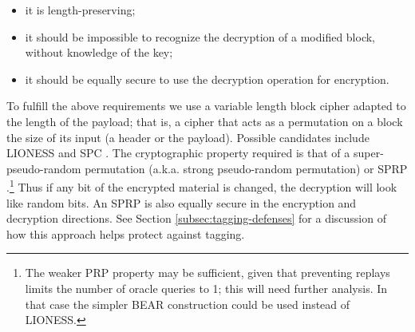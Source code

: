 \documentclass[11pt]{IEEEtran}
\begin{document}
\begin{itemize}
\item it is length-preserving;

\item it should be impossible to recognize the decryption of a modified
      block, without knowledge of the key;
\item it should be equally secure to use the decryption operation
      for encryption.
\end{itemize}

To fulfill the above requirements we use a variable length block
cipher adapted to the length of the payload; that
is, a cipher that acts as a permutation on a block the size of its
input (a header or the payload).  Possible candidates
include LIONESS \cite{BEAR-LIONESS} and SPC \cite{SPC}.
The cryptographic property required is that of a super-pseudo-random
permutation (a.k.a. strong pseudo-random permutation) or SPRP \cite{sprp}.\footnote{
The weaker PRP property may be sufficient, given that preventing
replays limits the number of oracle queries to 1; this will need
further analysis.  In that case the simpler BEAR construction
\cite{BEAR-LIONESS} could be used instead of LIONESS.}
Thus if any bit of
the encrypted material is changed, the decryption will look like random
bits.  An SPRP is also equally secure in the encryption and decryption
directions.  See Section \ref{subsec:tagging-defenses} for a
discussion of how this approach helps protect against tagging.


%
\end{document}
